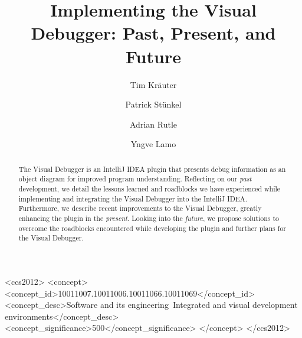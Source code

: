 \documentclass[sigconf]{acmart}
\begin{document}
\title{Implementing the Visual Debugger: Past, Present, and Future}

\author{Tim Kr\"{a}uter}

\author{Patrick Stünkel}

\author{Adrian Rutle}

\author{Yngve Lamo}

\renewcommand{\shortauthors}{Kräuter et al.}
\newcommand{\intellij}{IntelliJ IDEA}

\begin{abstract}
    The Visual Debugger is an IntelliJ IDEA plugin that presents debug information as an object diagram for improved program understanding.
    Reflecting on our \textit{past} development, we detail the lessons learned and roadblocks we have experienced while implementing and integrating the Visual Debugger into the IntelliJ IDEA.
    Furthermore, we describe recent improvements to the Visual Debugger, greatly enhancing the plugin in the \textit{present}.
    Looking into the \textit{future}, we propose solutions to overcome the roadblocks encountered while developing the plugin and further plans for the Visual Debugger.
\end{abstract}

\begin{CCSXML}
<ccs2012>
   <concept>
       <concept_id>10011007.10011006.10011066.10011069</concept_id>
       <concept_desc>Software and its engineering~Integrated and visual development environments</concept_desc>
       <concept_significance>500</concept_significance>
       </concept>
 </ccs2012>
\end{CCSXML}
\end{document}
